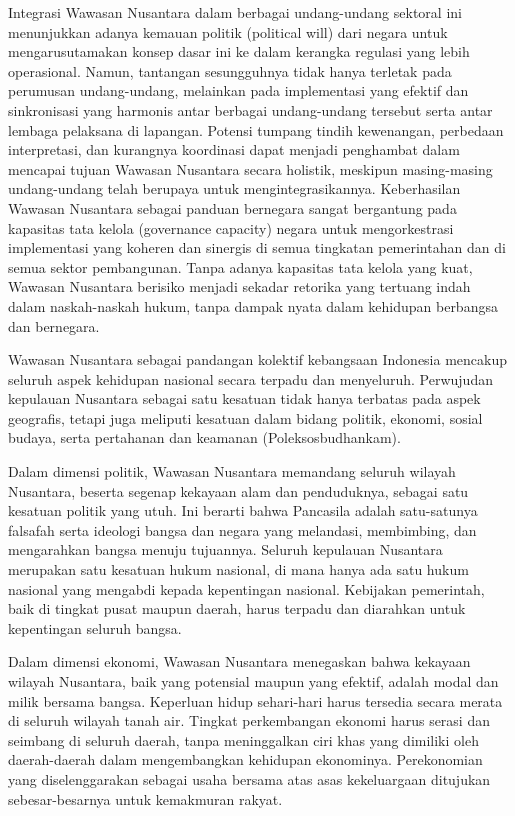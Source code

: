 \documentclass[12pt, a4paper]{article}
\begin{document}
Integrasi Wawasan Nusantara dalam berbagai undang-undang sektoral ini menunjukkan adanya kemauan politik (political will) dari negara untuk mengarusutamakan konsep dasar ini ke dalam kerangka regulasi yang lebih operasional. Namun, tantangan sesungguhnya tidak hanya terletak pada perumusan undang-undang, melainkan pada implementasi yang efektif dan sinkronisasi yang harmonis antar berbagai undang-undang tersebut serta antar lembaga pelaksana di lapangan. Potensi tumpang tindih kewenangan, perbedaan interpretasi, dan kurangnya koordinasi dapat menjadi penghambat dalam mencapai tujuan Wawasan Nusantara secara holistik, meskipun masing-masing undang-undang telah berupaya untuk mengintegrasikannya. Keberhasilan Wawasan Nusantara sebagai panduan bernegara sangat bergantung pada kapasitas tata kelola (governance capacity) negara untuk mengorkestrasi implementasi yang koheren dan sinergis di semua tingkatan pemerintahan dan di semua sektor pembangunan. Tanpa adanya kapasitas tata kelola yang kuat, Wawasan Nusantara berisiko menjadi sekadar retorika yang tertuang indah dalam naskah-naskah hukum, tanpa dampak nyata dalam kehidupan berbangsa dan bernegara.  

Wawasan Nusantara sebagai pandangan kolektif kebangsaan Indonesia mencakup seluruh aspek kehidupan nasional secara terpadu dan menyeluruh. Perwujudan kepulauan Nusantara sebagai satu kesatuan tidak hanya terbatas pada aspek geografis, tetapi juga meliputi kesatuan dalam bidang politik, ekonomi, sosial budaya, serta pertahanan dan keamanan (Poleksosbudhankam).  

Dalam dimensi politik, Wawasan Nusantara memandang seluruh wilayah Nusantara, beserta segenap kekayaan alam dan penduduknya, sebagai satu kesatuan politik yang utuh. Ini berarti bahwa Pancasila adalah satu-satunya falsafah serta ideologi bangsa dan negara yang melandasi, membimbing, dan mengarahkan bangsa menuju tujuannya. Seluruh kepulauan Nusantara merupakan satu kesatuan hukum nasional, di mana hanya ada satu hukum nasional yang mengabdi kepada kepentingan nasional. Kebijakan pemerintah, baik di tingkat pusat maupun daerah, harus terpadu dan diarahkan untuk kepentingan seluruh bangsa.  

Dalam dimensi ekonomi, Wawasan Nusantara menegaskan bahwa kekayaan wilayah Nusantara, baik yang potensial maupun yang efektif, adalah modal dan milik bersama bangsa. Keperluan hidup sehari-hari harus tersedia secara merata di seluruh wilayah tanah air. Tingkat perkembangan ekonomi harus serasi dan seimbang di seluruh daerah, tanpa meninggalkan ciri khas yang dimiliki oleh daerah-daerah dalam mengembangkan kehidupan ekonominya. Perekonomian yang diselenggarakan sebagai usaha bersama atas asas kekeluargaan ditujukan sebesar-besarnya untuk kemakmuran rakyat.  
\end{document}
